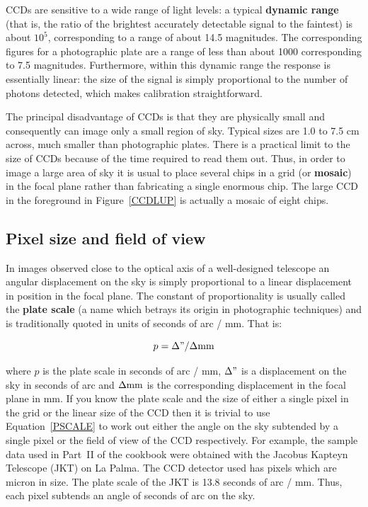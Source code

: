 \documentclass[twoside,11pt]{starlink}
\begin{document}
CCDs are sensitive to a wide range of light levels: a typical \textbf{dynamic range} (that is, the ratio of the brightest accurately detectable
signal to the faintest) is about $10^{5}$, corresponding to a range of
about 14.5 magnitudes.  The corresponding figures for a photographic plate
are a range of less than about 1000 corresponding to 7.5 magnitudes.
Furthermore, within this dynamic range the response is essentially linear:
the size of the signal is simply proportional to the number of photons
detected, which makes calibration straightforward.

The principal disadvantage of CCDs is that they are physically small and
consequently can image only a small region of sky.  Typical sizes are
1.0 to 7.5 cm across, much smaller than photographic plates.  There is
a practical limit to the size of CCDs because of the time required to read
them out.  Thus, in order to image a large area of sky it is usual to
place several chips in a grid (or \textbf{mosaic}) in the focal plane rather
than fabricating a single enormous chip.  The large CCD in the foreground
in Figure~\ref{CCDLUP} is actually a mosaic of eight chips.

\subsection{Pixel size and field of view}

In images observed close to the optical axis of a well-designed telescope
an angular displacement on the sky is simply proportional to a linear
displacement in position in the focal plane.  The constant of
proportionality is usually called the \textbf{plate scale} (a name which
betrays its origin in photographic techniques) and is traditionally
quoted in units of seconds of arc / mm.  That is:

\begin{equation}
p = \Delta " / \Delta {\rm mm}  \label{PSCALE}
\end{equation}

where $p$ is the plate scale in seconds of arc / mm, $\Delta "$ is a
displacement on the sky in seconds of arc and $\Delta {\rm mm}$ is the
corresponding displacement in the focal plane in mm.  If you know the plate
scale and the size of either a single pixel in the grid or the linear size
of the CCD then it is trivial to use Equation~\ref{PSCALE} to work out
either the angle on the sky subtended by a single pixel or the field of
view of the CCD respectively.  For example, the sample data used in Part~II
of the cookbook were obtained with the Jacobus Kapteyn Telescope (JKT) on
La Palma.  The CCD detector used has pixels which are
micron in size.
The plate scale of the JKT is 13.8 seconds of arc / mm.  Thus, each
pixel subtends an angle of
seconds of arc on the sky.
\end{document}

